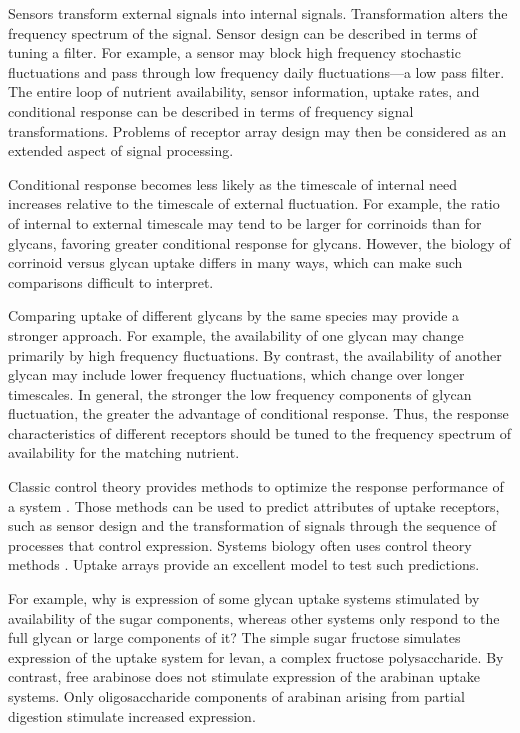 \documentclass[\mydocfontsize]{article}
\begin{document}
\begin{multicols}{2}
Sensors transform external signals into internal signals. Transformation alters the frequency spectrum of the signal. Sensor design can be described in terms of tuning a filter. For example, a sensor may block high frequency stochastic fluctuations and pass through low frequency daily fluctuations---a low pass filter. The entire loop of nutrient availability, sensor information, uptake rates, and conditional response can be described in terms of frequency signal transformations. Problems of receptor array design may then be considered as an extended aspect of signal processing. 

 Conditional response becomes less likely as the timescale of internal need increases relative to the timescale of external fluctuation. For example, the ratio of internal to external timescale may tend to be larger for corrinoids than for glycans, favoring greater conditional response for glycans. However, the biology of corrinoid versus glycan uptake differs in many ways, which can make such comparisons difficult to interpret. 

Comparing uptake of different glycans by the same species may provide a stronger approach. For example, the availability of one glycan may change primarily by high frequency fluctuations. By contrast, the availability of another glycan may include lower frequency fluctuations, which change over longer timescales. In general, the stronger the low frequency components of glycan fluctuation, the greater the advantage of conditional response. Thus, the response characteristics of different receptors should be tuned to the frequency spectrum of availability for the matching nutrient.

Classic control theory provides methods to optimize the response performance of a system \autocite{ogata09modern,dorf16modern}. Those methods can be used to predict attributes of uptake receptors, such as sensor design and the transformation of signals through the sequence of processes that control expression. Systems biology often uses control theory methods \autocite{alon07an-introduction,09control}. Uptake arrays provide an excellent model to test such predictions.

For example, why is expression of some glycan uptake systems stimulated by availability of the sugar components, whereas other systems only respond to the full glycan or large components of it?  The simple sugar fructose simulates expression of the uptake system for levan, a complex fructose polysaccharide. By contrast, free arabinose does not stimulate expression of the arabinan uptake systems. Only oligosaccharide components of arabinan arising from partial digestion stimulate increased expression. 


\end{multicols}
\end{document}
